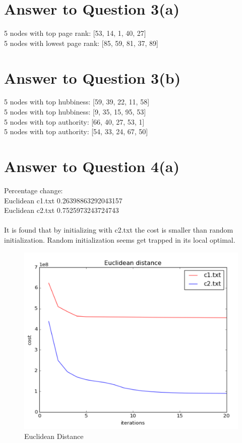 \documentclass[11pt]{article}
\begin{document}
\pagebreak[4]
\section*{Answer to Question 3(a)}
5 nodes with top page rank: [53, 14, 1, 40, 27]\\
5 nodes with lowest page rank: [85, 59, 81, 37, 89]

\pagebreak[4]
\section*{Answer to Question 3(b)}
5 nodes with top hubbiness: [59, 39, 22, 11, 58]\\
5 nodes with top hubbiness: [9, 35, 15, 95, 53]\\
5 nodes with top authority: [66, 40, 27, 53, 1]\\
5 nodes with top authority: [54, 33, 24, 67, 50]

\pagebreak[4]
\section*{Answer to Question 4(a)}
Percentage change:\\
Euclidean c1.txt 0.26398863292043157\\
Euclidean c2.txt 0.7525973243724743\\
\\
It is found that by initializing with c2.txt the cost is smaller than random initialization.
Random initialization seems get trapped in its local optimal.

\begin{figure}[h]
\center
\includegraphics[scale=0.7]{Euclidean.png}
\caption{Euclidean Distance}
\end{figure}
\end{document}
